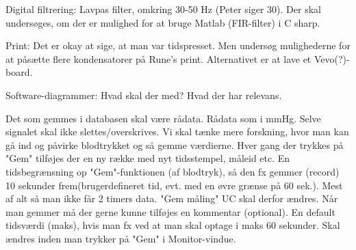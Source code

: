 Digital filtrering: Lavpas filter, omkring 30-50 Hz (Peter siger 30). Der skal undersøges, om der er mulighed for at bruge Matlab (FIR-filter) i C sharp. 

Print: Det er okay at sige, at man var tidspresset. Men undersøg mulighederne for at påsætte flere kondensatorer på Rune's print. Alternativet er at lave et Vevo(?)-board. 

Software-diagrammer: Hvad skal der med? Hvad der har relevans. 

Det som gemmes i databasen skal være rådata. Rådata som i mmHg. 
Selve signalet skal ikke slettes/overskrives. Vi skal tænke mere forskning, hvor man kan gå ind og påvirke blodtrykket og så gemme værdierne. Hver gang der trykkes på "Gem" tilføjes der en ny række med nyt tidsstempel, måleid etc. 
En tidsbegrænsning op "Gem"-funktionen (af blodtryk), så den fx gemmer (record) 10 sekunder frem(brugerdefineret tid, evt. med en øvre grænse på 60 sek.). Mest af alt så man ikke får 2 timers data. "Gem måling" UC skal derfor ændres. Når man gemmer må der gerne kunne tilføjes en kommentar (optional). 
	En default tidsværdi (maks), hvis man fx ved at man skal optage i maks 60 sekunder. Skal ændres inden man trykker på "Gem" i Monitor-vindue. 

